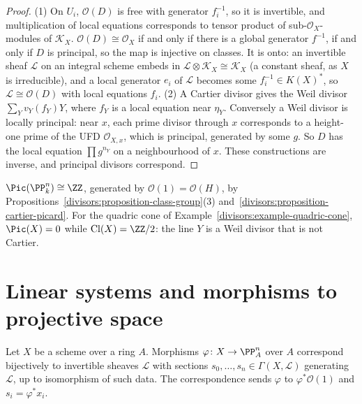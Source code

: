 \begin{proof}
(1) On $U_i$, $\mathcal{O}(D)$ is free with generator $f_i^{-1}$, so it is invertible, and multiplication of local equations corresponds to tensor product of
sub-$\mathcal{O}_X$-modules of $\mathcal{K}_X$. $\mathcal{O}(D) \cong \mathcal{O}_X$ if and only if there is a global generator $f^{-1}$, if and only if $D$ is principal, so the map
is injective on classes. It is onto: an invertible sheaf $\mathcal{L}$ on an integral scheme embeds in $\mathcal{L} \otimes \mathcal{K}_X \cong \mathcal{K}_X$ (a constant sheaf, as
$X$ is irreducible), and a local generator $e_i$ of $\mathcal{L}$ becomes some $f_i^{-1} \in K(X)^*$, so $\mathcal{L} \cong \mathcal{O}(D)$ with local equations $f_i$.
(2) A Cartier divisor gives the Weil divisor $\sum_Yv_Y(f_Y)Y$, where $f_Y$ is a local equation near $\eta_Y$. Conversely a Weil divisor is locally principal:
near $x$, each prime divisor through $x$ corresponds to a height-one prime of the UFD $\mathcal{O}_{X,x}$, which is principal, generated by some $g$. So $D$ has
the local equation $\prod g^{n_Y}$ on a neighbourhood of $x$. These constructions are inverse, and principal divisors correspond.
\end{proof}

\begin{example}\label{divisors:example-picard-projective}
$\Pic(\PP^n_k) \cong \ZZ$, generated by $\mathcal{O}(1) = \mathcal{O}(H)$, by Propositions~\ref{divisors:proposition-class-group}(3) and~\ref{divisors:proposition-cartier-picard}.
For the quadric cone of Example~\ref{divisors:example-quadric-cone}, $\Pic(X) = 0$ while $\mathrm{Cl}(X) = \ZZ/2$: the line $Y$ is a Weil divisor that is not Cartier.
\end{example}

\section{Linear systems and morphisms to projective space}\label{divisors:section-linear-systems}

\begin{proposition}\label{divisors:proposition-morphisms-projective}
Let $X$ be a scheme over a ring $A$. Morphisms $\varphi \colon X \to \PP^n_A$ over $A$ correspond bijectively to invertible sheaves $\mathcal{L}$ with sections
$s_0, \ldots, s_n \in \Gamma(X, \mathcal{L})$ generating $\mathcal{L}$, up to isomorphism of such data. The correspondence sends $\varphi$ to $\varphi^*\mathcal{O}(1)$ and
$s_i = \varphi^*x_i$.
\end{proposition}

